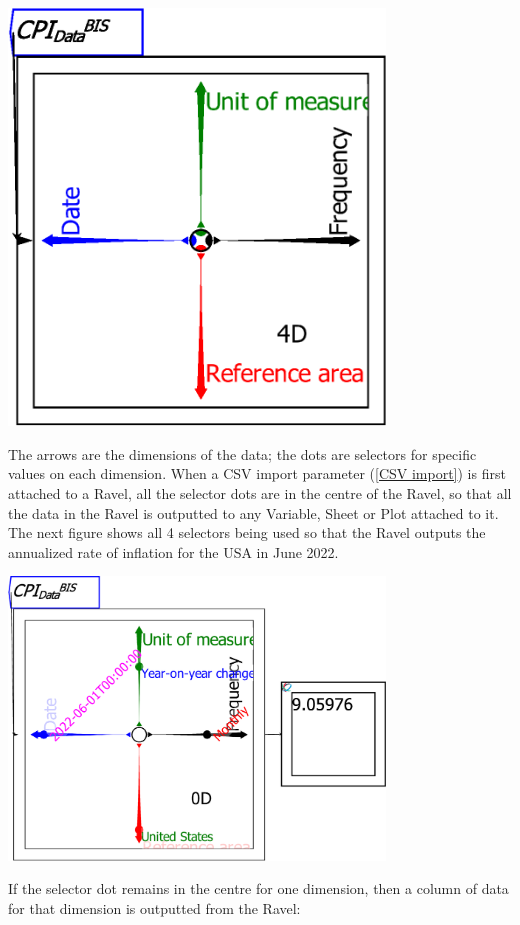 \includegraphics[width=10cm]{images/RavelDataImporting02}

The arrows are the dimensions of the data; the dots are selectors
for specific values on each dimension. When a CSV import parameter
(\ref{CSV import}) is first attached to a Ravel, all the selector
dots are in the centre of the Ravel, so that all the data in the Ravel
is outputted to any Variable, Sheet or Plot attached to it. The next
figure shows all 4 selectors being used so that the Ravel outputs
the annualized rate of inflation for the USA in June 2022.

\includegraphics[width=10cm]{images/RavelSingleDataPointSelected}

If the selector dot remains in the centre for one dimension, then
a column of data for that dimension is outputted from the Ravel:

